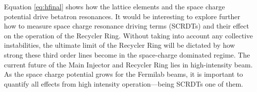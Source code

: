Equation \ref{eq:hfinal} shows how the lattice elements and the space charge potential drive betatron resonances. It would be interesting to explore further how to measure space charge resonance driving terms (SCRDTs) and their effect on the operation of the Recycler Ring. Without taking into account any collective instabilities, the ultimate limit of the Recycler Ring will be dictated by how strong these third order lines become in the space-charge dominated regime. The current future of the Main Injector and Recycler Ring lies in high-intensity beam. As the space charge potential grows for the Fermilab beams, it is important to quantify all effects from high intensity operation---being SCRDTs one of them.
